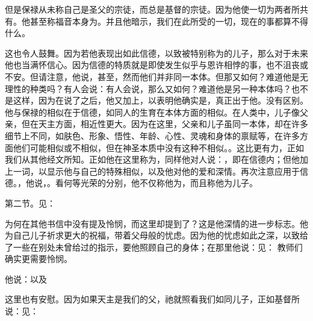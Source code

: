 但是保禄从未称自己是圣父的宗徒，而总是基督的宗徒。因为他使一切为两者所共有。他甚至称福音本身为。并且他暗示，我们在此所受的一切，现在的事都算不得什么。\par

\par

这也令人鼓舞。因为若他表现出如此信德，以致被特别称为的儿子，那么对于未来他也当满怀信心。因为信德的特质就是即使发生似乎与恩许相悖的事，也不沮丧或不安。但请注意，他说，甚至，然而他们并非同一本体。但那又如何？难道他是无理性的种类吗？有人会说：有人会说，那么又如何？难道他是另一种本体吗？也不是这样，因为在说了之后，他又加上，以表明他确实是，真正出于他。没有区别。他与保禄的相似在于信德，如同人的生育在本体方面的相似。在人类中，儿子像父亲，但在天主方面，相近性更大。因为在这里，父亲和儿子虽同一本体，却在许多细节上不同，如肤色、形象、悟性、年龄、心性、灵魂和身体的禀赋等，在许多方面他们可能相似或不相似，但在神圣本质中没有这种不相似。。这比更有力，正如我们从其他经文所知。正如他在这里称为，同样他对人说：，即在信德内；但他加上一词，以显示他与自己的特殊相似，以及他对他的爱和深情。再次注意应用于信德。，他说，。看何等光荣的分别，他不仅称他为，而且称他为儿子。\par

第二节。见：\par

为何在其他书信中没有提及怜悯，而这里却提到了？这是他深情的进一步标志。他为自己儿子祈求更大的祝福，带着父母般的忧虑。因为他的忧虑如此之深，以致给了一些在别处未曾给过的指示，要他照顾自己的身体；在那里他说：见： 教师们确实更需要怜悯。\par

他说：以及\par

这里也有安慰。因为如果天主是我们的父，祂就照看我们如同儿子，正如基督所说：见：\par

